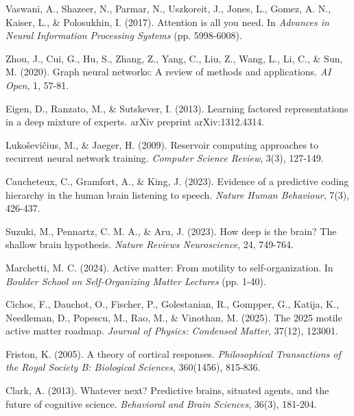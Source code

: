 \documentclass[11pt,a4paper,twocolumn]{article}
\begin{document}
\newpage
\twocolumn[%
\vspace{-1em}
\vspace{0.5em}
]
\begin{thebibliography}{19}
 Vaswani, A., Shazeer, N., Parmar, N., Uszkoreit, J., Jones, L., Gomez, A. N., Kaiser, L., \& Polosukhin, I. (2017). Attention is all you need. In \textit{Advances in Neural Information Processing Systems} (pp. 5998-6008).

 Zhou, J., Cui, G., Hu, S., Zhang, Z., Yang, C., Liu, Z., Wang, L., Li, C., \& Sun, M. (2020). Graph neural networks: A review of methods and applications. \textit{AI Open}, 1, 57-81.

 Eigen, D., Ranzato, M., \& Sutskever, I. (2013). Learning factored representations in a deep mixture of experts. arXiv preprint arXiv:1312.4314.

 Lukoševičius, M., \& Jaeger, H. (2009). Reservoir computing approaches to recurrent neural network training. \textit{Computer Science Review}, 3(3), 127-149.

 Caucheteux, C., Gramfort, A., \& King, J. (2023). Evidence of a predictive coding hierarchy in the human brain listening to speech. \textit{Nature Human Behaviour}, 7(3), 426-437.

 Suzuki, M., Pennartz, C. M. A., \& Aru, J. (2023). How deep is the brain? The shallow brain hypothesis. \textit{Nature Reviews Neuroscience}, 24, 749-764.

 Marchetti, M. C. (2024). Active matter: From motility to self-organization. In \textit{Boulder School on Self-Organizing Matter Lectures} (pp. 1-40).

 Cichos, F., Dauchot, O., Fischer, P., Golestanian, R., Gompper, G., Katija, K., Needleman, D., Popescu, M., Rao, M., \& Vinothan, M. (2025). The 2025 motile active matter roadmap. \textit{Journal of Physics: Condensed Matter}, 37(12), 123001.

 Friston, K. (2005). A theory of cortical responses. \textit{Philosophical Transactions of the Royal Society B: Biological Sciences}, 360(1456), 815-836.

 Clark, A. (2013). Whatever next? Predictive brains, situated agents, and the future of cognitive science. \textit{Behavioral and Brain Sciences}, 36(3), 181-204.


\end{thebibliography}
\end{document}
